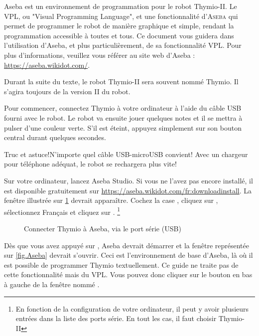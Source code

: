 
Aseba est un environnement de programmation pour le robot Thymio-II. Le VPL, ou "Visual Programming Language", et une fonctionnalité d'\textsc{Aseba} qui permet de programmer le robot de manière graphique et simple, rendant la programmation accessible à toutes et tous. Ce document vous guidera dans l'utilisation d'Aseba, et plus particulièrement, de sa fonctionnalité VPL. Pour plus d'informations, veuillez vous référer au site web d'Aseba : \url{https://aseba.wikidot.com/}.

Durant la suite du texte, le robot Thymio-II sera souvent nommé Thymio. Il s'agira toujours de la version II du robot.


Pour commencer, connectez Thymio à votre ordinateur à l'aide du câble USB fourni avec le robot. Le robot va ensuite jouer quelques notes et il se mettra à pulser d'une couleur verte. S'il est éteint, appuyez simplement sur son bouton central durant quelques secondes.

\begin{bclogo}[couleur = blue!30, arrondi = 0.1, logo = \bcinfo, ombre = true]{Truc et astuce!}N'importe quel câble USB-microUSB convient! Avec un chargeur pour téléphone adéquat, le robot se rechargera plus vite!
\end{bclogo}

Sur votre ordinateur, lancez Aseba Studio. Si vous ne l'avez pas encore installé, il est disponible gratuitement sur \url{https://aseba.wikidot.com/fr:downloadinstall}. La fenêtre illustrée sur \cref{fig.connect} devrait apparaître. Cochez la case , cliquez sur , sélectionnez Français et cliquez sur . \footnote{En fonction de la configuration de votre ordinateur, il peut y avoir plusieurs entrées dans la liste des ports série. En tout les cas, il faut choisir Thymio-II}

\begin{figure}
\begin{center}
\caption{Connecter Thymio à Aseba, via le port série (USB)}\label{fig.connect}
\end{center}
\end{figure} 

Dès que vous avez appuyé sur , Aseba devrait démarrer et la fenêtre représentée sur \cref{fig.Aseba} devrait s'ouvrir. Ceci est l'environnement de base d'Aseba, là où il est possible de programmer Thymio textuellement. Ce guide ne traite pas de cette fonctionnalité mais du VPL. Vous pouvez donc cliquer sur le bouton en bas à gauche de la fenêtre nommé .

